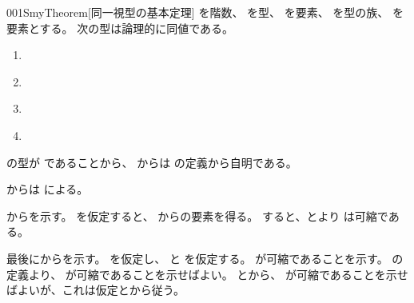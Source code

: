 \documentclass[index]{subfiles}
\begin{document}
\begin{myBlock}{001S}{myTheorem}[同一視型の基本定理]
  を階数、
  を型、
  を要素、
  を型の族、
  を要素とする。
  次の型は論理的に同値である。
  \begin{enumerate}
  \item \label{001S:0000} 
  \item \label{001S:0001} 
  \item \label{001S:0002} 
  \item \label{001S:0003} 
  \end{enumerate}
\end{myBlock}
\begin{myProof}
  の型が
  であることから、
  からは
  \myInlineMath{\myEquiv}の定義から自明である。

  からは
  による。

  からを示す。
  を仮定すると、
  からの要素を得る。
  すると、とより
  は可縮である。

  最後にからを示す。
  を仮定し、
  と
  を仮定する。
  が可縮であることを示す。
  \myInlineMath{\myFiber{\myBlank}{\myBlank}}の定義より、
  が可縮であることを示せばよい。
  とから、
  が可縮であることを示せばよいが、これは仮定とから従う。
\end{myProof}
\end{document}
